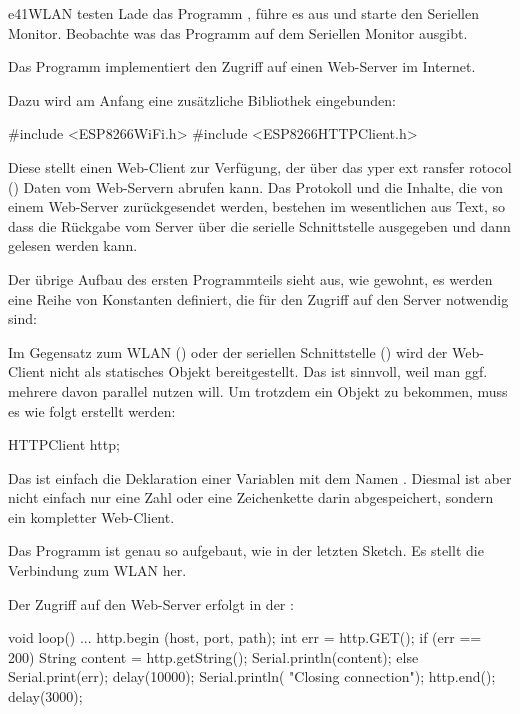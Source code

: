 \begin{excercise}{e41}{WLAN testen}
Lade das Programm , führe es aus und starte den Seriellen Monitor.
Beobachte was das Programm auf dem Seriellen Monitor ausgibt.
\end{excercise}


Das Programm  implementiert den Zugriff auf einen Web-Server im Internet.

Dazu wird am Anfang eine zusätzliche Bibliothek eingebunden:

\begin{src}
#include <ESP8266WiFi.h>
#include <ESP8266HTTPClient.h>
\end{src}


Diese stellt einen Web-Client zur Verfügung, der über das yper ext ransfer rotocol ()
Daten vom Web-Servern abrufen kann. Das Protokoll und die Inhalte, die von einem Web-Server zurückgesendet werden, bestehen im wesentlichen aus Text,
so dass die Rückgabe vom Server über die serielle Schnittstelle ausgegeben und dann gelesen werden kann.

Der übrige Aufbau des ersten Programmteils sieht aus, wie gewohnt, es werden eine Reihe von Konstanten definiert, die für den
Zugriff auf den Server notwendig sind:


Im Gegensatz zum WLAN () oder der seriellen Schnittstelle () wird der Web-Client nicht als statisches
Objekt bereitgestellt. Das ist sinnvoll, weil man ggf. mehrere davon parallel nutzen will. Um trotzdem ein Objekt zu bekommen,
muss es wie folgt erstellt werden:

\begin{src}
HTTPClient http;
\end{src}

Das ist einfach die Deklaration einer Variablen mit dem Namen . Diesmal ist aber nicht einfach nur eine Zahl oder 
eine Zeichenkette darin abgespeichert, sondern ein kompletter Web-Client.

\vfill\null\columnbreak
Das Programm  ist genau so aufgebaut, wie in der letzten Sketch. Es stellt die Verbindung zum WLAN her.

Der Zugriff auf den Web-Server erfolgt in der :

\begin{src}
void loop() {
  ...
  http.begin (host, port, path);
  int err = http.GET();
  if (err == 200)
  {
    String content = 
      http.getString();
    Serial.println(content);
  }
  else
  {
    Serial.print(err);
    delay(10000);
  }
  Serial.println(
    "Closing connection");
  http.end();
  delay(3000);
}
\end{src}


